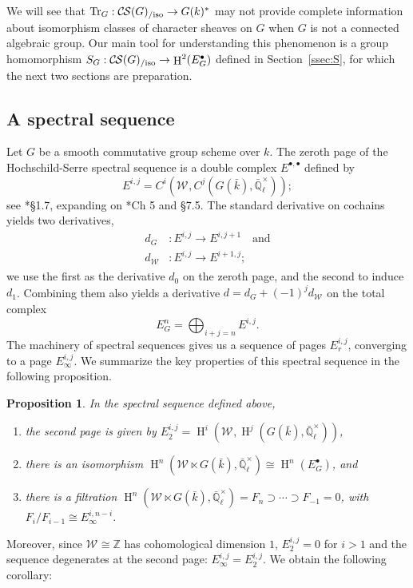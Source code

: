 \documentclass[10pt]{amsart}
\theoremstyle{plain}
\newtheorem{proposition}[theorem]{Proposition}
\theoremstyle{definition}
\newcommand{\ZZ}{{\mathbb{Z}}}
\newcommand{\EE}{\mathbb{\bar Q}_\ell}
\newcommand{\bFq}{\bar{k}}
\newcommand{\Fq}{k}
\newcommand{\EEx}{\EE^\times}
\newcommand{\Weil}[1]{\mathcal{W}_{#1}}
\DeclareMathOperator{\Hh}{H}
\newcommand{\TrFrob}[1]{\operatorname{Tr}_{#1}}
\newcommand{\CS}{{\mathcal{C\hskip-0.8pt S}}}
\newcommand{\CSiso}[1]{\CS(#1)_{/\text{iso}}}
\begin{document}
We will see that $\TrFrob{G} : \CSiso{G} \to G(\Fq)^*$ may not provide complete
information about isomorphism classes of character sheaves on $G$ when $G$ is not a connected algebraic group.
Our main tool for understanding this phenomenon
is a group homomorphism $S_G: \CSiso{G} \to \Hh^2(E^\bullet_G)$ defined in Section~\ref{ssec:S}, for which the next two sections are preparation.

\subsection{A spectral sequence}\label{ssec:E}

Let $G$ be a smooth commutative group scheme over $\Fq$.
The zeroth page of the Hochschild-Serre spectral sequence
is a double complex $E^{\bullet, \bullet}$ defined by
\[
E^{i,j} = C^i(\Weil{}, C^j(G(\bFq), \EEx));
\]
see \cite{vakil:Algebraic_Geometry}*{\S 1.7}, expanding on \cite{weibel:Homological_Algebra}*{Ch 5 and \S 7.5}.
The standard derivative on cochains yields two derivatives,
\begin{align*}
d_G &: E^{i,j} \to E^{i,j+1} \quad \mbox{and} \\
d_{\Weil{}} &: E^{i,j} \to E^{i+1,j};
\end{align*}
we use the first as the derivative $d_0$ on the zeroth page, and the second to induce $d_1$.
Combining them also yields a derivative $d = d_G + (-1)^j d_{\Weil{}}$ on the total complex
\[
E^n_G = \bigoplus_{i+j=n} E^{i,j}.
\]
The machinery of spectral sequences gives us a sequence of pages $E_r^{i,j}$, converging to a page $E_{\infty}^{i,j}$.
We summarize the key properties of this spectral sequence in the following proposition.

\begin{proposition} In the spectral sequence defined above,
\begin{enumerate}
\item the second page is given by $E_2^{i,j} = \Hh^i(\Weil{}, \Hh^j(G(\bFq), \EEx))$,
\item there is an isomorphism $\Hh^n(\Weil{} \ltimes G(\bFq), \EEx) \cong \Hh^n(E_G^\bullet)$, and
\item there is a filtration $\Hh^n(\Weil{} \ltimes G(\bFq), \EEx) = F_n \supset \cdots \supset F_{-1} = 0$, with $F_i / F_{i-1} \cong E_{\infty}^{i, n-i}$.
\end{enumerate}
\end{proposition}

Moreover, since $\Weil{} \cong \ZZ$ has cohomological dimension $1$, $E_2^{i,j} = 0$ for $i > 1$ and the
sequence degenerates at the second page: $E_{\infty}^{i,j} = E_2^{i,j}$. We obtain the following corollary:
\end{document}
